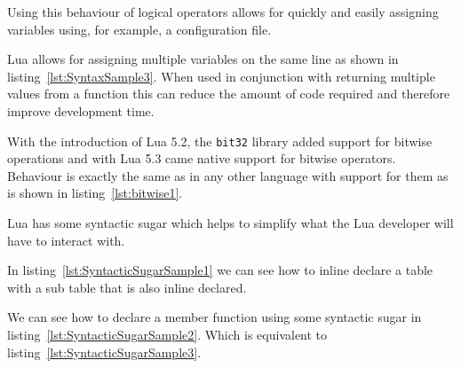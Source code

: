 \documentclass[11pt,a4paper,titlepage]{report}
\begin{document}
	\singlespacing
	
	\onehalfspacing

	Using this behaviour of logical operators allows for quickly and easily assigning variables using, for example, a configuration file.

	Lua allows for assigning multiple variables on the same line as shown in listing~\ref{lst:SyntaxSample3}. When used in conjunction with returning multiple values from a function this can reduce the amount of code required and therefore improve development time.
	
	\singlespacing
	 
	\onehalfspacing


	With the introduction of Lua 5.2, the \texttt{bit32} library added support for bitwise operations and with Lua 5.3 came native support for bitwise operators. Behaviour is exactly the same as in any other language with support for them as is shown in listing~\ref{lst:bitwise1}.

	\singlespacing
	 
	\onehalfspacing

	Lua has some syntactic sugar which helps to simplify what the Lua developer will have to interact with.
	
	\singlespacing
	
	\onehalfspacing

	In listing~\ref{lst:SyntacticSugarSample1} we can see how to inline declare a table with a sub table that is also inline declared.
	\onehalfspacing

	\singlespacing
	
	\onehalfspacing

	We can see how to declare a member function using some syntactic sugar in listing~\ref{lst:SyntacticSugarSample2}. Which is equivalent to listing~\ref{lst:SyntacticSugarSample3}.
	\onehalfspacing

	\singlespacing
	
	\onehalfspacing
\end{document}

